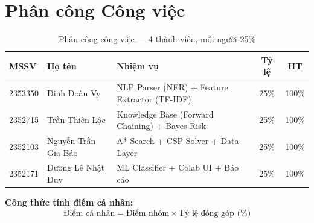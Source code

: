 
\section{Phân công Công việc}
\label{sec:division}

\begin{table}[H]
\centering
\begin{tabular}{|l|l|l|c|c|}
\hline
\textbf{MSSV} & \textbf{Họ tên} & \textbf{Nhiệm vụ} & \textbf{Tỷ lệ} & \textbf{HT} \\
\hline
2353350 & Đinh Đoàn Vy & NLP Parser (NER) + Feature Extractor (TF-IDF) & 25\% & 100\% \\
\hline
2352715 & Trần Thiên Lộc & Knowledge Base (Forward Chaining) + Bayes Risk & 25\% & 100\% \\
\hline
2352103 & Nguyễn Trần Gia Bảo & A* Search + CSP Solver + Data Layer & 25\% & 100\% \\
\hline
2352171 & Dương Lê Nhật Duy & ML Classifier + Colab UI + Báo cáo & 25\% & 100\% \\
\hline
\end{tabular}
\caption{Phân công công việc --- 4 thành viên, mỗi người 25\%}
\label{tab:division}
\end{table}

\textbf{Công thức tính điểm cá nhân:}
\begin{equation}
  \text{Điểm cá nhân} = \text{Điểm nhóm} \times \text{Tỷ lệ đóng góp (\%)}
\end{equation}
